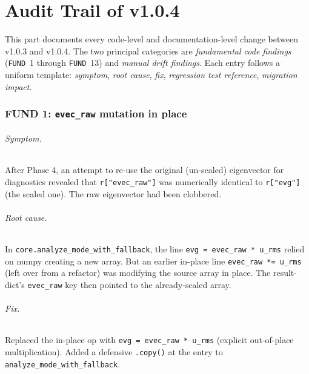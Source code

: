 \documentclass[10pt,a4paper,twoside]{article}
\newcommand{\fn}[1]{\texttt{#1}}
\begin{document}
\part{Audit Trail of v1.0.4}
\label{sec:audit-trail}

This part documents every code-level and documentation-level change
between v1.0.3 and v1.0.4. The two principal categories are
\emph{fundamental code findings} (\fn{FUND}~1 through \fn{FUND}~13)
and \emph{manual drift findings}. Each entry follows a uniform
template: \emph{symptom}, \emph{root cause}, \emph{fix},
\emph{regression test reference}, \emph{migration impact}.

\section{FUND 1: \texttt{evec\_raw} mutation in place}
\label{sec:fund-1}

\paragraph{Symptom.}
After Phase 4, an attempt to re-use the original (un-scaled)
eigenvector for diagnostics revealed that \texttt{r["evec\_raw"]}
was numerically identical to \texttt{r["evg"]} (the scaled one).
The raw eigenvector had been clobbered.

\paragraph{Root cause.}
In \fn{core.analyze\_mode\_with\_fallback}, the line
\texttt{evg = evec\_raw * u\_rms} relied on numpy creating a new
array. But an earlier in-place line
\texttt{evec\_raw *= u\_rms} (left over from a refactor) was
modifying the source array in place. The result-dict's
\texttt{evec\_raw} key then pointed to the already-scaled array.

\paragraph{Fix.}
Replaced the in-place op with \texttt{evg = evec\_raw * u\_rms}
(explicit out-of-place multiplication). Added a defensive
\fn{.copy()} at the entry to \fn{analyze\_mode\_with\_fallback}.
\end{document}
